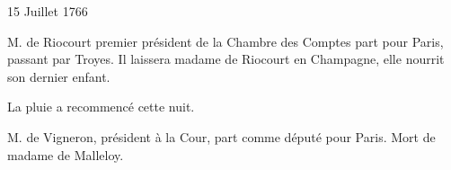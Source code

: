                      \begin{diary}{15 Juillet 1766}{}
                        
                        
                           M. de Riocourt
                           premier président de la Chambre des Comptes
                           part pour Paris, passant par
                              Troyes. Il
                           laissera madame de Riocourt en Champagne,
                           elle nourrit son dernier enfant. \bigskip
        
        
                         La pluie a recommencé cette nuit. \bigskip
        
        
                        
                           M. de Vigneron, président à la
                           Cour, part comme
                           député pour Paris. Mort de
                              madame de Malleloy.
                        \bigskip
        
        
                     \end{diary}

